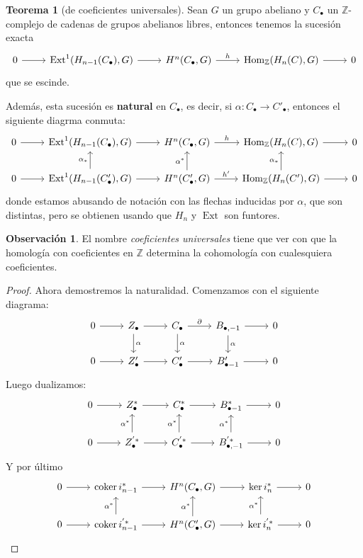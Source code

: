\documentclass[spanish]{book}
\theoremstyle{definition}
\newtheorem*{obs}{Observación}
\newtheorem*{teo}{Teorema}
\newcommand{\Z}{\mathbb{Z}}
\DeclareMathOperator{\coker}{coker}
\DeclareMathOperator{\Hom}{Hom}
\DeclareMathOperator{\Ext}{Ext}
\begin{document}
\begin{teo}[de coeficientes universales]
	Sean $G$ un grupo abeliano y $C_\bullet$ un $\Z$-complejo de cadenas de grupos abelianos libres, entonces tenemos la sucesión exacta
	\[\begin{tikzcd}
		0\arrow[r]&\Ext^1(H_{n-1}(C_\bullet),G)\arrow[r]&H^n(C_\bullet,G)\arrow[r,"h"]&\Hom_\Z(H_n(C),G)\arrow[r]&0
	\end{tikzcd}\]
	que se escinde.
	
	Además, esta sucesión es \textbf{natural} en $C_\bullet$, es decir, si $	\alpha:C_\bullet\to C'_\bullet$, entonces el siguiente diagrma conmuta:
	\[\begin{tikzcd}
		0\arrow[r]&\Ext^1(H_{n-1}(C_\bullet),G)\arrow[r]&H^n(C_\bullet,G)\arrow[r,"h"]&\Hom_\Z(H_n(C),G)\arrow[r]&0\\
		0\arrow[r]&\Ext^1(H_{n-1}(C'_\bullet),G)\arrow[r]\arrow[u,"\alpha_*"]&H^n(C'_\bullet,G)\arrow[r,"h'"]\arrow[u,"\alpha^*"]&\Hom_\Z(H_n(C'),G)\arrow[r]\arrow[u,"\alpha_*"]&0
	\end{tikzcd}\]
	donde estamos abusando de notación con las flechas inducidas por $\alpha$, que son distintas, pero se obtienen usando que $H_n$ y $\Ext$ son funtores.
\end{teo}
\begin{obs}
	El nombre \textit{coeficientes universales} tiene que ver con que la homología con coeficientes en $\Z$ determina la cohomología con cualesquiera coeficientes.
\end{obs}
\begin{proof}
	Ahora demostremos la naturalidad. Comenzamos con el siguiente diagrama:
	\[\begin{tikzcd}
		0\arrow[r]&Z_\bullet\arrow[r]\arrow[d,"\alpha"]&C_\bullet\arrow[r,"\partial"]\arrow[d,"\alpha"]&B_{\bullet,-1}\arrow[r]\arrow[d,"\alpha"]&0\\
		0\arrow[r]&Z'_\bullet\arrow[r]&C_\bullet'\arrow[r]&B'_{\bullet-1}\arrow[r]&0
	\end{tikzcd}\]
	Luego dualizamos:
	\[\begin{tikzcd}
		0\arrow[r]&Z^*_\bullet\arrow[r]&C^*_\bullet\arrow[r]&B^*_{\bullet-1}\arrow[r]&0\\
		0\arrow[r]&Z^{'*}_\bullet\arrow[r]\arrow[u,"\alpha^*"]&C^{'*}_\bullet\arrow[r]\arrow[u,"\alpha^*"]&B^{'*}_{\bullet,-1}\arrow[r]\arrow[u,"\alpha^*"]&0
	\end{tikzcd}\]
	Y por último
	\[\begin{tikzcd}
		0\arrow[r]&\coker i^*_{n-1}\arrow[r]&H^n(C_\bullet,G)\arrow[r]&\ker i^*_n\arrow[r]&0\\
		0\arrow[r]&\coker i^{'*}_{n-1}\arrow[r]\arrow[u,"\alpha^*"]&H^n(C'_\bullet,G)\arrow[r]\arrow[u,"\alpha^*"]&\ker i^{'*}_n\arrow[r]\arrow[u,"\alpha^*"]&0
	\end{tikzcd}\]
\end{proof}
\end{document}
